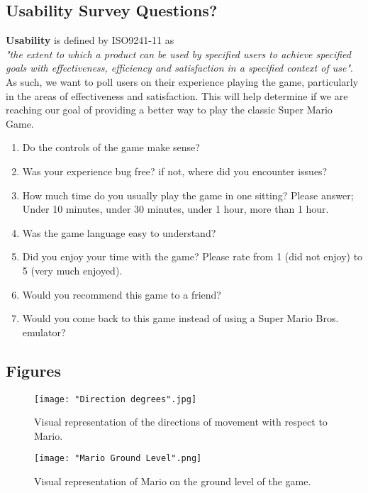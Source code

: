\documentclass[12pt, titlepage]{article}
\begin{document}
\subsection{Usability Survey Questions?}

\textbf{Usability} is defined by ISO9241-11 as\\

\emph{"the extent to which a product can be used by specified users to achieve specified goals with effectiveness, efficiency and satisfaction in a specified context of use"}.\\

As such, we want to poll users on their experience playing the game, particularly in the areas of effectiveness and satisfaction. This will help determine if we are reaching our goal of providing a better way to play the classic Super Mario Game.

\begin{enumerate}
    \item Do the controls of the game make sense?
    \item Was your experience bug free? if not, where did you encounter issues?
    \item How much time do you usually play the game in one sitting? Please answer; Under 10 minutes, under 30 minutes, under 1 hour, more than 1 hour.
    \item Was the game language easy to understand?
    \item Did you enjoy your time with the game? Please rate from 1 (did not enjoy) to 5 (very much enjoyed).
    \item Would you recommend this game to a friend?
    \item Would you come back to this game instead of using a Super Mario Bros. emulator?
\end{enumerate}

\subsection{Figures}
\begin{figure}[!h]
    \centering
    \texttt{[image: "Direction degrees".jpg]}
    \caption{Visual representation of the directions of movement with respect to Mario.}
\end{figure}

\begin{figure}[!h]
    \centering
    \texttt{[image: "Mario Ground Level".png]}
    \caption{Visual representation of Mario on the ground level of the game.}
\end{figure}
\end{document}
